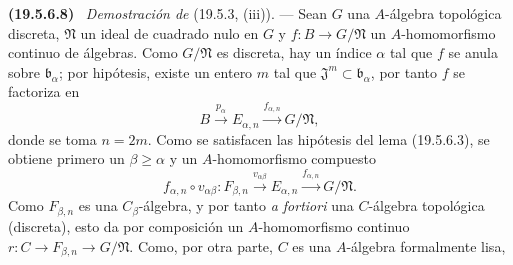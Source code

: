 \documentclass[10pt,oneside]{book}
\makeatletter
\newcommand{\setmanualcurrentlabel}[1]{\def\@currentlabel{#1}}
\newcommand{\oldpage}[2][]{%
  \setcounter{footnote}{0}%
  \marginpar{\scriptsize\textbf{#1}~|~#2}\ignorespaces}
\newenvironment{env}[1][]{\setmanualcurrentlabel{#1}\par\medskip\noindent\textbf{(#1)}\ }{\par}
\makeatother
\begin{document}
\begin{env}[19.5.6.8]
\label{0.19.5.6.8-es}
\emph{Demostración de} (19.5.3, (iii)). --- Sean $G$ una $A$-álgebra
topológica discreta, $\mathfrak N$ un ideal de cuadrado nulo en $G$ y
$f:B\to G/\mathfrak N$ un $A$-homomorfismo continuo de álgebras. Como
$G/\mathfrak N$ es discreta, hay un índice $\alpha$ tal que $f$ se anula
sobre $\mathfrak b_\alpha$; por hipótesis, existe un entero $m$ tal que
$\mathfrak J^m\subset\mathfrak b_\alpha$, por tanto $f$ se factoriza en
\[
  B\xrightarrow{p_\alpha}E_{\alpha,n}
  \xrightarrow{f_{\alpha,n}}G/\mathfrak N,
\]
donde se toma $n=2m$. Como se satisfacen las hipótesis del lema (19.5.6.3), se
obtiene primero un $\beta\geq\alpha$ y un $A$-homomorfismo compuesto
\begin{equation}
\label{0.19.5.6.9-es}
  f_{\alpha,n}\circ v_{\alpha\beta}:F_{\beta,n}
  \xrightarrow{v_{\alpha\beta}}E_{\alpha,n}
  \xrightarrow{f_{\alpha,n}}G/\mathfrak N.
  \tag{19.5.6.9}
\end{equation}
Como $F_{\beta,n}$ es una $C_\beta$-álgebra, y por tanto \emph{a fortiori} una
$C$-álgebra topológica (discreta), esto da por composición un
$A$-homomorfismo continuo
$r:C\to F_{\beta,n}\to G/\mathfrak N$. Como, por otra parte, $C$ es una
$A$-álgebra formalmente lisa,

\oldpage[0\textsubscript{IV-1}]{99}


\end{env}
\end{document}
